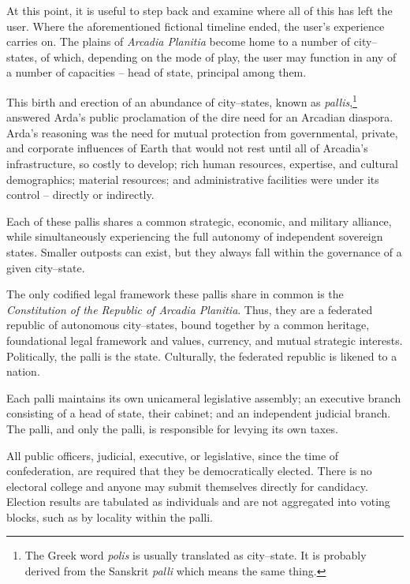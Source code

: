 

At this point, it is useful to step back and examine where all of this has left the user. Where the aforementioned fictional timeline ended, the user's experience carries on. The plains of {\it Arcadia Planitia} become home to a number of city--states, of which, depending on the mode of play, the user may function in any of a number of capacities -- head of state, principal among them.

This birth and erection of an abundance of city--states, known as {\it pallis},\footnote{The Greek word {\it polis} is usually translated as city--state. It is probably derived from the Sanskrit {\it palli} which means the same thing.} answered Arda's public proclamation of the dire need for an Arcadian diaspora. Arda's reasoning was the need for mutual protection from governmental, private, and corporate influences of Earth that would not rest until all of Arcadia's infrastructure, so costly to develop; rich human resources, expertise, and cultural demographics; material resources; and administrative facilities were under its control -- directly or indirectly.

Each of these pallis shares a common strategic, economic, and military alliance, while simultaneously experiencing the full autonomy of independent sovereign states. Smaller outposts can exist, but they always fall within the governance of a given city--state.

The only codified legal framework these pallis share in common is the {\it Constitution of the Republic of Arcadia Planitia}. Thus, they are a federated republic of autonomous city--states, bound together by a common heritage, foundational legal framework and values, currency, and mutual strategic interests. Politically, the palli is the state. Culturally, the federated republic is likened to a nation.

Each palli maintains its own unicameral legislative assembly; an executive branch consisting of a head of state, their cabinet; and an independent judicial branch. The palli, and only the palli, is responsible for levying its own taxes.

All public officers, judicial, executive, or legislative, since the time of confederation, are required that they be democratically elected. There is no electoral college and anyone may submit themselves directly for candidacy. Election results are tabulated as individuals and are not aggregated into voting blocks, such as by locality within the palli.

